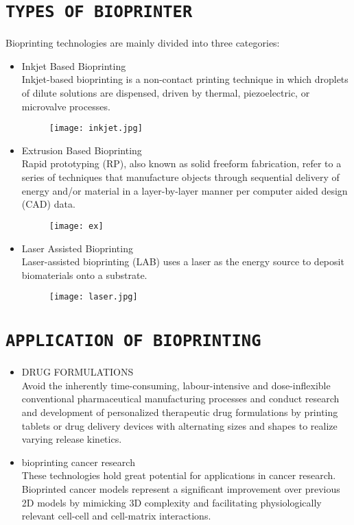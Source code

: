 \documentclass[11pt]{article}
\begin{document}
\section{\Large\texttt{TYPES OF BIOPRINTER}}
Bioprinting technologies are mainly divided into three categories:
\begin{itemize}


\item Inkjet Based Bioprinting\\
Inkjet-based bioprinting is a non-contact printing technique in which droplets of dilute solutions are dispensed, driven by thermal, piezoelectric, or microvalve processes.\\
\begin{figure}[h]
\centering
\texttt{[image: inkjet.jpg]}
\end{figure}

\item Extrusion Based Bioprinting\\
 Rapid prototyping (RP), also known as solid freeform fabrication, refer to a series of techniques that manufacture objects through sequential delivery of energy and/or material in a layer-by-layer manner per computer aided design (CAD) data.
\begin{figure}[h]
\centering
\texttt{[image: ex]}
\end{figure}
\item Laser Assisted Bioprinting\\
Laser-assisted bioprinting (LAB) uses a laser as the energy source to deposit biomaterials onto a substrate.
\begin{figure}[h]
\centering
\texttt{[image: laser.jpg]}
\end{figure}



\end{itemize}
\pagebreak

\section{\Large\texttt{APPLICATION OF BIOPRINTING}}
\begin{itemize}
\item DRUG FORMULATIONS\\
Avoid the inherently time-consuming, labour-intensive and dose-inflexible conventional pharmaceutical manufacturing processes and conduct research and development of personalized therapeutic drug formulations by printing tablets or drug delivery devices with alternating sizes and shapes to realize varying release kinetics.\\
\item bioprinting cancer research\\
 These technologies hold great potential for applications in cancer research. Bioprinted cancer models represent a significant improvement over previous 2D models by mimicking 3D complexity and facilitating physiologically relevant cell-cell and cell-matrix interactions.

\end{itemize}
\end{document}
